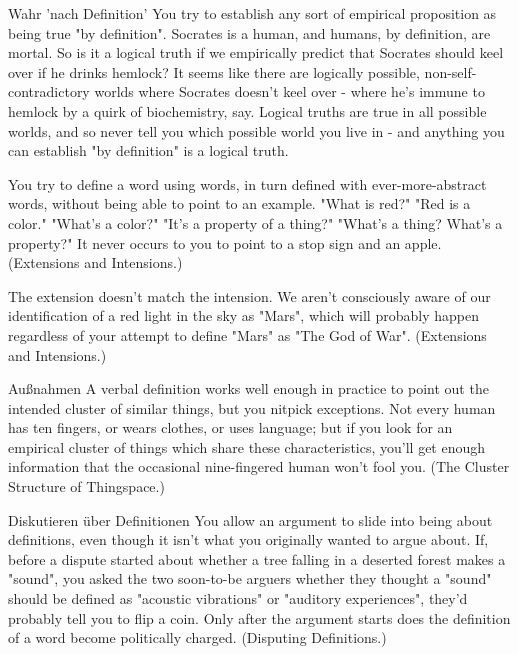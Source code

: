
\begin{frame}[c]{Wahr 'nach Definition'}
    You try to establish any sort of empirical proposition as being true "by definition".  Socrates is a human, and humans, by definition, are mortal.  So is it a logical truth if we empirically predict that Socrates should keel over if he drinks hemlock?  It seems like there are logically possible, non-self-contradictory worlds where Socrates doesn't keel over - where he's immune to hemlock by a quirk of biochemistry, say.  Logical truths are true in all possible worlds, and so never tell you which possible world you live in - and anything you can establish "by definition" is a logical truth.
\end{frame}


\begin{frame}[c]
    You try to define a word using words, in turn defined with ever-more-abstract words, without being able to point to an example.  "What is red?"  "Red is a color."  "What's a color?"  "It's a property of a thing?"  "What's a thing?  What's a property?"  It never occurs to you to point to a stop sign and an apple.  (Extensions and Intensions.)
\end{frame}


\begin{frame}[c]
    The extension doesn't match the intension.  We aren't consciously aware of our identification of a red light in the sky as "Mars", which will probably happen regardless of your attempt to define "Mars" as "The God of War".  (Extensions and Intensions.)
\end{frame}


\begin{frame}[c]{Außnahmen}
    A verbal definition works well enough in practice to point out the intended cluster of similar things, but you nitpick exceptions. Not every human has ten fingers, or wears clothes, or uses language; but if you look for an empirical cluster of things which share these characteristics, you'll get enough information that the occasional nine-fingered human won't fool you.  (The Cluster Structure of Thingspace.)
\end{frame}


\begin{frame}[c]{Diskutieren über Definitionen}
    You allow an argument to slide into being about definitions, even though it isn't what you originally wanted to argue about. If, before a dispute started about whether a tree falling in a deserted forest makes a "sound", you asked the two soon-to-be arguers whether they thought a "sound" should be defined as "acoustic vibrations" or "auditory experiences", they'd probably tell you to flip a coin.  Only after the argument starts does the definition of a word become politically charged.  (Disputing Definitions.)
\end{frame}


